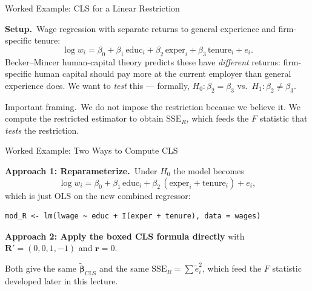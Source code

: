 \documentclass[handout, aspectratio=169]{beamer}
\numberwithin{equation}{section}
\begin{document}
\begin{frame}{Worked Example: CLS for a Linear Restriction}

\textbf{Setup.}\, Wage regression with separate returns to general experience and firm-specific tenure:
$$\log w_i = \beta_0 + \beta_1\,\text{educ}_i + \beta_2\,\text{exper}_i + \beta_3\,\text{tenure}_i + e_i.$$
Becker--Mincer human-capital theory predicts these have \emph{different} returns: firm-specific human capital should pay more at the current employer than general experience does.  We want to \emph{test} this --- formally, $H_0: \beta_2 = \beta_3$ vs.\ $H_1: \beta_2 \ne \beta_3$.

\pause
\bigskip

\alert{Important framing.}\, We do not impose the restriction because we believe it.  We compute the restricted estimator to obtain $\text{SSE}_R$, which feeds the $F$ statistic that \emph{tests} the restriction.

\end{frame}

\begin{frame}[fragile]{Worked Example: Two Ways to Compute CLS}

\textbf{Approach 1: Reparameterize.}\, Under $H_0$ the model becomes
$$\log w_i = \beta_0 + \beta_1\,\text{educ}_i + \beta_2\,(\text{exper}_i + \text{tenure}_i) + e_i,$$
which is just OLS on the new combined regressor:
\begin{lstlisting}
mod_R <- lm(lwage ~ educ + I(exper + tenure), data = wages)
\end{lstlisting}

\pause
\bigskip

\textbf{Approach 2: Apply the boxed CLS formula directly} with $\bm{R}' = (0, 0, 1, -1)$ and $\bm{r} = 0$.

\pause
\bigskip

Both give the same $\tilde{\bm{\beta}}_{\text{CLS}}$ and the same $\text{SSE}_R = \sum \tilde{e}_i^2$, which feed the $F$ statistic developed later in this lecture.

\end{frame}
\end{document}
